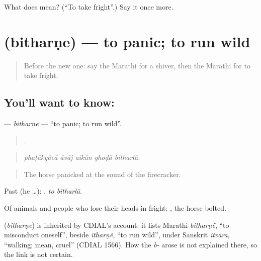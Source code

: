 \begin{tcolorbox}[breakable,colback=teal!4,colframe=teal!35!black,title={Before you move on}]
What does  mean? (\textquotedblleft{}To take fright\textquotedblright{}.) Say it once more.
\end{tcolorbox}
\section[\texorpdfstring{\mr{बिथरणे} (bitharṇe)}{बिथरणे (bitharṇe)}]{ (bitharṇe) — to panic; to run wild}

\label{lesson:MR-C452-bitharne}



\begin{quote}
Before the new one: say the Marathi for a shiver, then the Marathi for to take fright.
\end{quote}

\subsection*{You'll want to know: }
\textbf{} — \emph{bitharṇe} — \textquotedblleft{}to panic; to run wild\textquotedblright{}.

\begin{quote}
    .
\end{quote}

\begin{quote}
\emph{phaṭākyācā āvāj aikūn ghoḍā bitharlā.}
\end{quote}

\begin{quote}
The horse panicked at the sound of the firecracker.
\end{quote}

Past (he …):  , \emph{to bitharlā}.

Of animals and people who lose their heads in fright:  , the horse bolted.

\begin{cousinweb}
\textbf{} (\emph{bitharṇe}) is inherited by CDIAL's account: it lists Marathi \emph{bitharṇẽ}, \textquotedblleft{}to misconduct oneself\textquotedblright{}, beside \emph{itharṇẽ}, \textquotedblleft{}to run wild\textquotedblright{}, under Sanskrit \emph{itvara}, \textquotedblleft{}walking; mean, cruel\textquotedblright{} (CDIAL 1566). How the \emph{b-} arose is not explained there, so the link is not certain.
\end{cousinweb}

